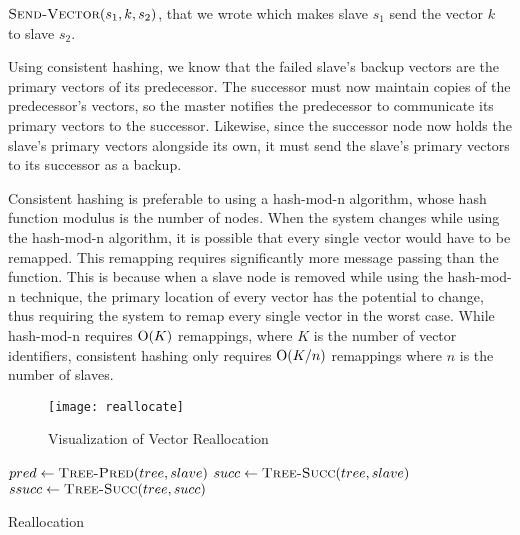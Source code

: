 \(\mathrm{\textsc{Send-Vector}}(s_1, k, s_2)\),
that we wrote which makes slave \(s_1\) send the vector \(k\) to slave \(s_2\).
\par
Using consistent hashing, we know that the failed slave's backup vectors are
the primary vectors of its predecessor. The successor must now maintain copies
of the predecessor's vectors, so the master notifies the predecessor to
communicate its primary vectors to the successor. Likewise, since the successor
node now holds the slave's primary vectors alongside its own, it must send the
slave's primary vectors to its successor as a backup.
\par
Consistent hashing is preferable to using a hash-mod-n algorithm,
whose hash function modulus is the number of nodes. When the system changes
while using the hash-mod-n algorithm, it is possible that every single vector
would have to be remapped. This remapping requires significantly more message
passing than the  function. This is because
when a slave node is removed while using the hash-mod-n technique, the primary
location of every vector has the potential to change, thus requiring the system to remap every
single vector in the worst case. \cite{kleppmann2017} While hash-mod-n requires
\(\mathrm{O}(K)\) remappings, where \(K\) is the number of vector identifiers, consistent
hashing only requires \(\mathrm{O}(K/n)\) remappings where \(n\) is the number of
slaves. \cite{karger1997}
%
\begin{figure}
    \centering
    \texttt{[image: reallocate]}
    \caption{Visualization of Vector Reallocation}
    \label{fig:vector-reallocation}
\end{figure}
%
\begin{algorithm}
    \begin{algorithmic}
            \State $pred \gets \Call{Tree-Pred}{tree, slave}$
            \State $succ \gets \Call{Tree-Succ}{tree, slave}$
            \State $ssucc \gets \Call{Tree-Succ}{tree, succ}$
                \State {}
            \EndFor
                \State {}
            \EndFor
            \State {}
        \EndProcedure
    \end{algorithmic}
    \caption{Reallocation}
    \label{alg:reallocate}
\end{algorithm}
%
